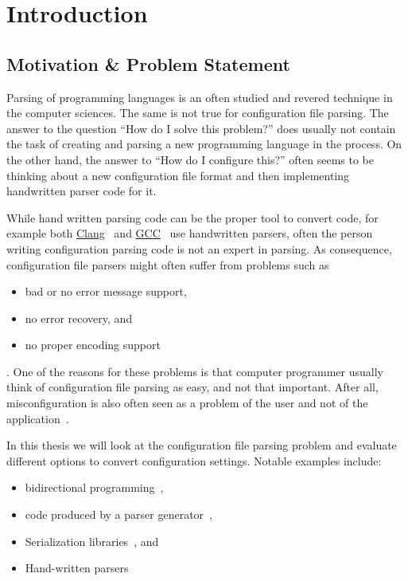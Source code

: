 \chapter{Introduction}

\section{Motivation \& Problem Statement}

Parsing of programming languages is an often studied and revered technique in the computer sciences. The same is not true for configuration file parsing. The answer to the question “How do I solve this problem?” does usually not contain the task of creating and parsing a new programming language in the process. On the other hand, the answer to “How do I configure this?” often seems to be thinking about a new configuration file format and then implementing handwritten parser code for it.

While hand written parsing code can be the proper tool to convert code, for example both \href{http://clang.llvm.org}{Clang}~\cite{bendersky2012clang} and \href{http://gcc.gnu.org}{GCC}~\cite{myers2008cparser} use handwritten parsers, often the person writing configuration parsing code is not an expert in parsing. As consequence, configuration file parsers might often suffer from problems such as

\begin{itemize}
  \item bad or no error message support,
  \item no error recovery, and
  \item no proper encoding support
\end{itemize}

. One of the reasons for these problems is that computer programmer usually think of configuration file parsing as easy, and not that important. After all, misconfiguration is also often seen as a problem of the user and not of the application~\cite{xu2013not}.

In this thesis we will look at the configuration file parsing problem and evaluate different options to convert configuration settings. Notable examples include:

\begin{itemize}
  \item bidirectional programming~\cite{foster2005combinators, bohannon2006relational, lutterkort2008augeas, ko2016bigul, raab2016improving},
  \item code produced by a parser generator~\cite{denny2008ielr, parr2014adaptive, warth2016modular, bates2017aprt},
  \item Serialization libraries~\cite{sumaray2012cds, pacini2015performance}, and
  \item Hand-written parsers~\cite{myers2008cparser, bendersky2012clang}
\end{itemize}

